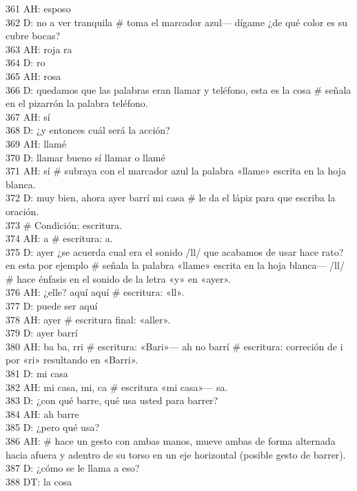 361 AH: esposo\\
362 D: no a ver tranquila \# toma el marcador azul--- dígame ¿de qué color es su cubre bocas?\\
363 AH: roja ra\\
364 D: ro\\
365 AH: rosa\\
366 D: quedamos que las palabras eran llamar y teléfono, esta es la cosa \# señala en el pizarrón la palabra teléfono.\\
367 AH: sí\\
368 D: ¿y entonces cuál será la acción?\\
369 AH: llamé\\
370 D: llamar bueno sí llamar o llamé\\
371 AH: sí \# subraya con el marcador azul la palabra «llame» escrita en la hoja blanca.\\
372 D: muy bien, ahora ayer barrí mi casa \# le da el lápiz para que escriba la oración.\\
373 \# Condición: escritura.\\
374 AH: a \# escritura: a.\\
375 D: ayer ¿se acuerda cual era el sonido /ll/ que acabamos de usar hace rato? en esta por ejemplo \# señala la palabra «llame» escrita en la hoja blanca--- /ll/ \# hace énfasis en el sonido de la letra «y» en «ayer».\\
376 AH: ¿elle? aquí aquí \# escritura: «ll».\\
377 D: puede ser aquí\\
378 AH: ayer \# escritura final: «aller».\\
379 D: ayer barrí\\
380 AH: ba ba, rri \# escritura: «Bari»--- ah no barrí \# escritura: correción de i por «ri» resultando en «Barri».\\
381 D: mi casa\\
382 AH: mi casa, mi, ca \# escritura «mi casa»--- sa.\\
383 D: ¿con qué barre, qué usa usted para barrer?\\
384 AH: ah barre\\
385 D: ¿pero qué usa?\\
386 AH: \# hace un gesto con ambas manos, mueve ambas de forma alternada hacia afuera y adentro de su torso en un eje horizontal (posible gesto de barrer).\\
387 D: ¿cómo se le llama a eso?\\
388 DT: la cosa\\
